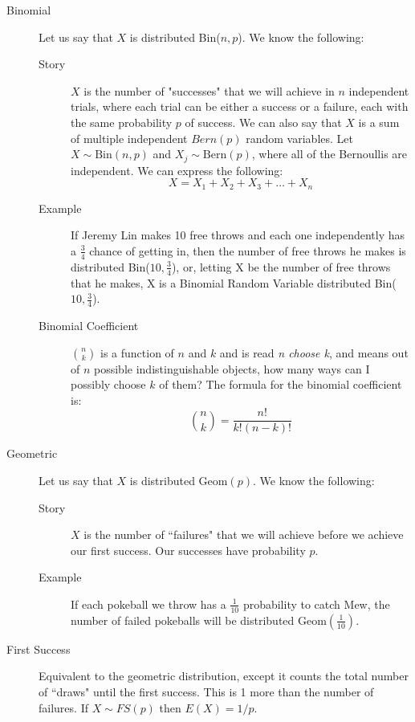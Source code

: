 \documentclass[10pt,landscape]{article}
\theoremstyle{definition}
\newcommand{\Bern}{\textrm{Bern}}
\newcommand{\Bin}{\textrm{Bin}}
\newcommand{\Geom}{\textrm{Geom}}
\begin{document}
\begin{multicols}{3}
\begin{description}
\item[Binomial] Let us say that $X$ is distributed \Bin($n,p$). We know the following:
\begin{description}
    \item[Story] $X$ is the number of "successes" that we will achieve in $n$ independent trials, where each trial can be either a success or a failure, each with the same probability $p$ of success. We can also say that $X$ is a sum of multiple independent $Bern(p)$ random variables. Let $X \sim \Bin(n, p)$ and $X_j \sim \Bern(p)$, where all of the Bernoullis are independent. We can express the following:
    \[X = X_1 + X_2 + X_3 + \dots + X_n\]
    \item[Example] If Jeremy Lin makes 10 free throws and each one independently has a $\frac{3}{4}$ chance of getting in, then the number of free throws he makes is distributed  \Bin($10,\frac{3}{4}$), or, letting X be the number of free throws that he makes, X is a Binomial Random Variable distributed  \Bin($10,\frac{3}{4}$).
    \item[Binomial Coefficient] ${n  \choose k}$ is a function of $n$ and $k$ and is read \emph{n choose k}, and means out of $n$ possible indistinguishable objects, how many ways can I possibly choose $k$ of them? The formula for the binomial coefficient is:
\[{n  \choose k} = \frac{n!}{k!(n-k)!}\]
\end{description}


\item[Geometric] Let us say that $X$ is distributed $\Geom(p)$. We know the following:
\begin{description}
    \item[Story] $X$ is the number of ``failures" that we will achieve before we achieve our first success. Our successes have probability $p$.
    \item[Example] If each pokeball we throw has a $\frac{1}{10}$ probability to catch Mew, the number of failed pokeballs will be distributed $\Geom(\frac{1}{10})$.
\end{description}

\item[First Success] Equivalent to the geometric distribution, except it counts the total number of ``draws" until the first success. This is 1 more than the number of failures. If $X \sim FS(p)$ then $E(X) = 1/p$.



\end{description}
\end{multicols}
\end{document}
